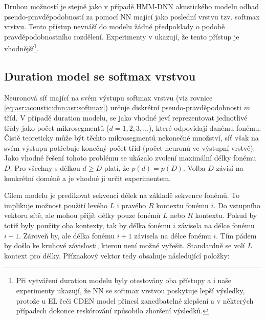 Druhou možností je stejně jako v případě HMM-DNN akustického modelu odhad pseudo-pravděpodobností za pomocí NN mající jako poslední vrstvu tzv. softmax vrstvu. Tento přístup nevnáší do modelu žádné předpoklady o podobě pravděpodobnostního rozdělení. Experimenty v \cite{Hadian2017} ukazují, že tento přístup je vhodnější\footnote{Při vytváření duration modelu byly otestovány oba přístupy a i naše experimenty ukazují, že NN se softmax vrstvou poskytuje lepší výsledky, protože u EL řeči CDEN model přinesl zanedbatelné zlepšení a v některých případech dokonce reskórování způsobilo zhoršení výsledků.}.

\subsection{Duration model se softmax vrstvou}
\label{chap:realisation:durationmodels:nn:softmax}

Neuronová síť mající na svém výstupu softmax vrstvu (viz rovnice \ref{eq:asr:acoustic:dnn:asr:softmax}) určuje diskrétní pseudo-pravděpodobnosti $m$ tříd. V případě duration modelu, se jako vhodné jeví reprezentovat jednotlivé třídy jako počet mikrosegmentů ($d=1,2,3,\dots$), které odpovídají danému fonému. Čistě teoreticky může být těchto mikrosegmentů nekonečné množství, síť však na svém výstupu potřebuje konečný počet tříd (počet neuronů ve výstupní vrstvě). Jako vhodné řešení tohoto problému se ukázalo zvolení maximální délky fonému $D$. Pro všechny s délkou $d \geq D$ platí, že $p\left(d\right) = p\left(D\right)$. \cite{Hadian2017} Volba $D$ závisí na konkrétní doméně a je vhodné ji určit experimentem.

Cílem modelu je predikovat sekvenci délek na základě sekvence fonémů. To implikuje možnost použití levého $L$ i pravého $R$ kontextu fonému $i$. Do vstupního vektoru sítě, ale mohou přijít délky pouze fonémů $L$ nebo $R$ kontextu. Pokud by totiž byly použity oba kontexty, tak by délka fonému $i$ závisela na délce fonému $i+1$. Zároveň by, ale délka fonému $i+1$ závisela na délce fonému $i$. Tím pádem by došlo ke kruhové závislosti, kterou není možné vyřešit. Standardně se volí $L$ kontext pro délky. Příznakový vektor tedy obsahuje následující položky:

